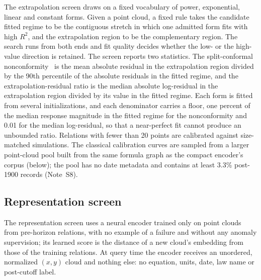 \documentclass{article}
\begin{document}
The extrapolation screen draws on a fixed vocabulary of power, exponential,
linear and constant forms. Given a point cloud, a fixed rule takes
the candidate fitted regime to be the contiguous stretch in which one admitted form
fits with high $R^{2}$, and the extrapolation region to be the complementary
region. The search runs from both ends and fit quality decides whether the low-
or the high-value direction is retained. The screen reports two statistics. The split-conformal
nonconformity~\cite{vovk2005} is the mean absolute residual in the extrapolation region divided by
the 90th percentile of the absolute residuals in the fitted regime, and the
extrapolation-residual ratio is the median absolute log-residual in the extrapolation region divided by its value in the fitted regime. Each
form is fitted from several initializations, and each denominator carries a
floor, one percent of the median response magnitude in the fitted regime for the
nonconformity and 0.01 for the median log-residual, so that a
near-perfect fit cannot produce an unbounded ratio. Relations with fewer than
20 points are calibrated against size-matched simulations. The classical calibration curves are sampled from a larger point-cloud pool built from the same formula graph as the compact encoder's corpus (below); the pool has no date metadata and contains at least 3.3\% post-1900 records (Note~S8).

\subsection{Representation screen}

The representation screen uses a neural encoder trained only on point clouds from pre-horizon relations, with no example of a failure and without any anomaly supervision; its learned score is the distance of a new cloud's embedding from those of the training relations. At query time the encoder receives an unordered, normalized $(x,y)$ cloud and nothing else: no equation, units, date, law name or post-cutoff label.
\end{document}
